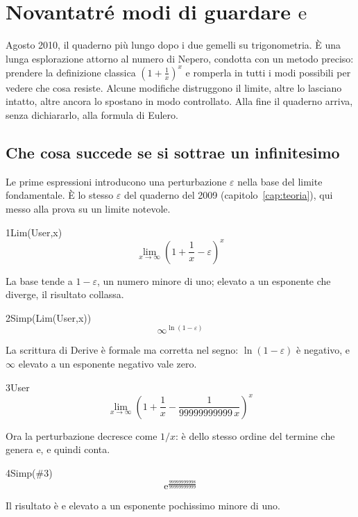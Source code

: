 \chapter{Novantatré modi di guardare $\mathrm{e}$}
\label{cap:e}

Agosto 2010, il quaderno più lungo dopo i due gemelli su trigonometria. È una lunga esplorazione attorno al numero di Nepero, condotta con un metodo preciso: prendere la definizione classica $\left(1+\tfrac1x\right)^x$ e romperla in tutti i modi possibili per vedere che cosa resiste. Alcune modifiche distruggono il limite, altre lo lasciano intatto, altre ancora lo spostano in modo controllato. Alla fine il quaderno arriva, senza dichiararlo, alla formula di Eulero.

\section{Che cosa succede se si sottrae un infinitesimo}

Le prime espressioni introducono una perturbazione $\varepsilon$ nella base del limite fondamentale. È lo stesso $\varepsilon$ del quaderno del 2009 (capitolo~\ref{cap:teoria}), qui messo alla prova su un limite notevole.

\begin{espr}{1}{Lim(User,x)}{}
\[
\lim_{x \to \infty} \left(1 + \frac{1}{x} - \varepsilon\right)^{x}
\]
\end{espr}
La base tende a $1-\varepsilon$, un numero minore di uno; elevato a un esponente che diverge, il risultato collassa.

\begin{espr}{2}{Simp(Lim(User,x))}{}
\[
\infty^{\ln\!\left(1 - \varepsilon\right)}
\]
\end{espr}
La scrittura di Derive è formale ma corretta nel segno: $\ln(1-\varepsilon)$ è negativo, e $\infty$ elevato a un esponente negativo vale zero.

\begin{espr}{3}{User}{}
\[
\lim_{x \to \infty} \left(1 + \frac{1}{x} - \frac{1}{99999999999\, x}\right)^{x}
\]
\end{espr}
Ora la perturbazione decresce come $1/x$: è dello stesso ordine del termine che genera $\mathrm{e}$, e quindi conta.

\begin{espr}{4}{Simp(\#3)}{}
\[
\mathrm{e}^{\frac{99999999998}{99999999999}}
\]
\end{espr}
Il risultato è $\mathrm{e}$ elevato a un esponente pochissimo minore di uno.

